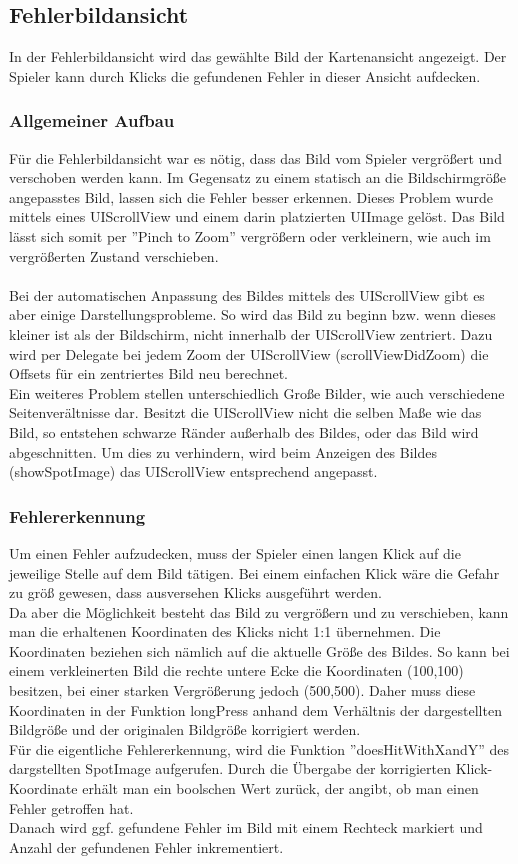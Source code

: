 \subsection{Fehlerbildansicht} 
In der Fehlerbildansicht wird das gewählte Bild der Kartenansicht angezeigt. Der
Spieler kann durch Klicks die gefundenen Fehler in dieser Ansicht aufdecken.
\subsubsection{Allgemeiner Aufbau}
Für die Fehlerbildansicht war es nötig, dass das Bild vom Spieler vergrößert und verschoben werden kann.
Im Gegensatz zu einem statisch an die Bildschirmgröße angepasstes Bild, lassen sich die Fehler besser erkennen.
Dieses Problem wurde mittels eines UIScrollView und einem darin platzierten UIImage gelöst.
Das Bild lässt sich somit per ''Pinch to Zoom'' vergrößern oder verkleinern, wie auch im vergrößerten Zustand verschieben.\\
\\
Bei der automatischen Anpassung des Bildes mittels des UIScrollView gibt es aber einige Darstellungsprobleme.
So wird das Bild zu beginn bzw. wenn dieses kleiner ist als der Bildschirm, nicht innerhalb der UIScrollView zentriert.
Dazu wird per Delegate bei jedem Zoom der UIScrollView (scrollViewDidZoom) die Offsets für ein zentriertes Bild neu berechnet.\\
Ein weiteres Problem stellen unterschiedlich Große Bilder, wie auch verschiedene Seitenverältnisse dar. Besitzt die UIScrollView
nicht die selben Maße wie das Bild, so entstehen schwarze Ränder außerhalb des Bildes, oder das Bild wird abgeschnitten.
Um dies zu verhindern, wird beim Anzeigen des Bildes (showSpotImage) das UIScrollView entsprechend angepasst.\\

\subsubsection{Fehlererkennung}
Um einen Fehler aufzudecken, muss der Spieler einen langen Klick auf die jeweilige Stelle auf dem Bild tätigen.
Bei einem einfachen Klick wäre die Gefahr zu größ gewesen, dass ausversehen Klicks ausgeführt werden.\\
Da aber die Möglichkeit besteht das Bild zu vergrößern und zu verschieben, kann man die erhaltenen Koordinaten
des Klicks nicht 1:1 übernehmen. Die Koordinaten beziehen sich nämlich auf die aktuelle Größe des Bildes. So kann bei
einem verkleinerten Bild die rechte untere Ecke die Koordinaten (100,100) besitzen, bei einer starken Vergrößerung
jedoch (500,500). Daher muss diese Koordinaten in der Funktion longPress anhand dem Verhältnis der dargestellten
Bildgröße und der originalen Bildgröße korrigiert werden.\\
Für die eigentliche Fehlererkennung, wird die Funktion ''doesHitWithXandY'' des dargstellten SpotImage aufgerufen. Durch
die Übergabe der korrigierten Klick-Koordinate erhält man ein boolschen Wert zurück, der angibt, ob man einen Fehler getroffen hat.\\
Danach wird ggf. gefundene Fehler im Bild mit einem Rechteck markiert und Anzahl der gefundenen Fehler inkrementiert.

